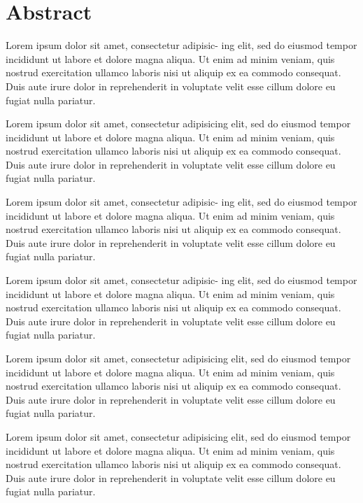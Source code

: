 \chapter*{Abstract}\label{chapter:abstract}
 Lorem ipsum dolor sit amet, consectetur adipisic-
ing elit, sed do eiusmod tempor incididunt ut labore et dolore magna aliqua. Ut enim ad
minim veniam, quis nostrud exercitation ullamco laboris nisi ut aliquip ex ea commodo
consequat. Duis aute irure dolor in reprehenderit in voluptate velit esse cillum dolore eu
fugiat nulla pariatur.


 Lorem ipsum dolor sit amet, consectetur
adipisicing elit, sed do eiusmod tempor incididunt ut labore et dolore magna aliqua.
Ut enim ad minim veniam, quis nostrud exercitation ullamco laboris nisi ut aliquip ex
ea commodo consequat. Duis aute irure dolor in reprehenderit in voluptate velit esse
cillum dolore eu fugiat nulla pariatur.


 Lorem ipsum dolor sit amet, consectetur adipisic-
ing elit, sed do eiusmod tempor incididunt ut labore et dolore magna aliqua. Ut enim ad
minim veniam, quis nostrud exercitation ullamco laboris nisi ut aliquip ex ea commodo
consequat. Duis aute irure dolor in reprehenderit in voluptate velit esse cillum dolore eu
fugiat nulla pariatur.


 Lorem ipsum dolor sit amet, consectetur adipisic-
ing elit, sed do eiusmod tempor incididunt ut labore et dolore magna aliqua. Ut enim ad
minim veniam, quis nostrud exercitation ullamco laboris nisi ut aliquip ex ea commodo
consequat. Duis aute irure dolor in reprehenderit in voluptate velit esse cillum dolore eu
fugiat nulla pariatur.


 Lorem ipsum dolor sit amet, consectetur
adipisicing elit, sed do eiusmod tempor incididunt ut labore et dolore magna aliqua.
Ut enim ad minim veniam, quis nostrud exercitation ullamco laboris nisi ut aliquip ex
ea commodo consequat. Duis aute irure dolor in reprehenderit in voluptate velit esse
cillum dolore eu fugiat nulla pariatur.


 Lorem ipsum dolor sit amet, consectetur
adipisicing elit, sed do eiusmod tempor incididunt ut labore et dolore magna aliqua.
Ut enim ad minim veniam, quis nostrud exercitation ullamco laboris nisi ut aliquip ex
ea commodo consequat. Duis aute irure dolor in reprehenderit in voluptate velit esse
cillum dolore eu fugiat nulla pariatur.
